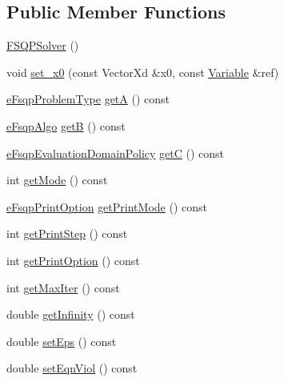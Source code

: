 \subsection*{Public Member Functions}
\begin{DoxyCompactItemize}
\item 
\hyperlink{classocra_1_1FSQPSolver_a8eeae2b05133e4f5e134fc1ee11ccb49}{F\+S\+Q\+P\+Solver} ()
\item 
void \hyperlink{classocra_1_1FSQPSolver_a17f6a88734d636c6e1af46d15d4b3e96}{set\+\_\+x0} (const Vector\+Xd \&x0, const \hyperlink{classocra_1_1Variable}{Variable} \&ref)
\item 
\hyperlink{classocra_1_1FSQPSolver_a1a9c37974603d734acab0d75bc9462ac}{e\+Fsqp\+Problem\+Type} \hyperlink{classocra_1_1FSQPSolver_ad059d844347c7939b6376e29b8b60cf2}{getA} () const
\item 
\hyperlink{classocra_1_1FSQPSolver_ad43d4e2dae6954df05123077cea0b7f5}{e\+Fsqp\+Algo} \hyperlink{classocra_1_1FSQPSolver_af5f7b99450125e07eba99edaaf1ab372}{getB} () const
\item 
\hyperlink{classocra_1_1FSQPSolver_a0569ab06022ffef1bd6d97599a5e4279}{e\+Fsqp\+Evaluation\+Domain\+Policy} \hyperlink{classocra_1_1FSQPSolver_a0eb5fe693fc9a34039e69945e9fdf484}{getC} () const
\item 
int \hyperlink{classocra_1_1FSQPSolver_a2ac151a7e6e43884a470dd9a373fadb9}{get\+Mode} () const
\item 
\hyperlink{classocra_1_1FSQPSolver_a4bb0d1e3b6b82bd9f683c6c7393f062d}{e\+Fsqp\+Print\+Option} \hyperlink{classocra_1_1FSQPSolver_a1511084f712ea3030b38cb6ce626118d}{get\+Print\+Mode} () const
\item 
int \hyperlink{classocra_1_1FSQPSolver_a6ef85f729aa01a38d87da2ed98ee72c2}{get\+Print\+Step} () const
\item 
int \hyperlink{classocra_1_1FSQPSolver_a1be56f4f2dba807d78869a5e18e2f467}{get\+Print\+Option} () const
\item 
int \hyperlink{classocra_1_1FSQPSolver_a8eddfbb44147ea2ea7ee98479a81a2d1}{get\+Max\+Iter} () const
\item 
double \hyperlink{classocra_1_1FSQPSolver_a8ee2a33cb9ec5991ac7fce0802e26c6b}{get\+Infinity} () const
\item 
double \hyperlink{classocra_1_1FSQPSolver_a47b2d328e1407acd9c9fabe0c361592c}{set\+Eps} () const
\item 
double \hyperlink{classocra_1_1FSQPSolver_a667a47f3565538d614750a07dc6d2ed9}{set\+Eqn\+Viol} () const
\item 

\end{DoxyCompactItemize}
